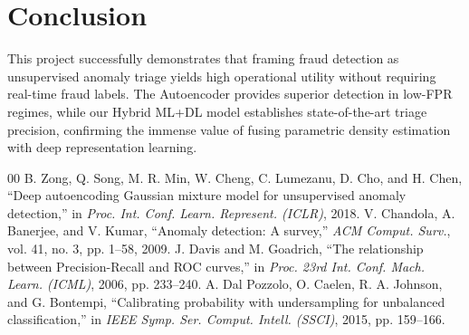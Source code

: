 \documentclass[conference]{IEEEtran}
\begin{document}
\section{Conclusion}
This project successfully demonstrates that framing fraud detection as unsupervised anomaly triage yields high operational utility without requiring real-time fraud labels. The Autoencoder provides superior detection in low-FPR regimes, while our Hybrid ML+DL model establishes state-of-the-art triage precision, confirming the immense value of fusing parametric density estimation with deep representation learning.

\begin{thebibliography}{00}
 B. Zong, Q. Song, M. R. Min, W. Cheng, C. Lumezanu, D. Cho, and H. Chen, ``Deep autoencoding Gaussian mixture model for unsupervised anomaly detection,'' in \textit{Proc. Int. Conf. Learn. Represent. (ICLR)}, 2018.
 V. Chandola, A. Banerjee, and V. Kumar, ``Anomaly detection: A survey,'' \textit{ACM Comput. Surv.}, vol. 41, no. 3, pp. 1--58, 2009.
 J. Davis and M. Goadrich, ``The relationship between Precision-Recall and ROC curves,'' in \textit{Proc. 23rd Int. Conf. Mach. Learn. (ICML)}, 2006, pp. 233--240.
 A. Dal Pozzolo, O. Caelen, R. A. Johnson, and G. Bontempi, ``Calibrating probability with undersampling for unbalanced classification,'' in \textit{IEEE Symp. Ser. Comput. Intell. (SSCI)}, 2015, pp. 159--166.
\end{thebibliography}
\end{document}
